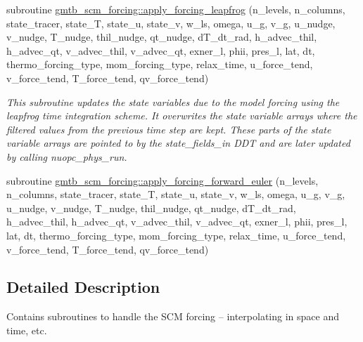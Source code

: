 {\bf }\par
\begin{DoxyCompactItemize}
\item 
subroutine \hyperlink{group__forcing_gaa9a429a52d986be1bc2458f56e8f77aa}{gmtb\+\_\+scm\+\_\+forcing\+::apply\+\_\+forcing\+\_\+leapfrog} (n\+\_\+levels, n\+\_\+columns, state\+\_\+tracer, state\+\_\+T, state\+\_\+u, state\+\_\+v, w\+\_\+ls, omega, u\+\_\+g, v\+\_\+g, u\+\_\+nudge,   v\+\_\+nudge, T\+\_\+nudge, thil\+\_\+nudge, qt\+\_\+nudge, d\+T\+\_\+dt\+\_\+rad, h\+\_\+advec\+\_\+thil, h\+\_\+advec\+\_\+qt, v\+\_\+advec\+\_\+thil, v\+\_\+advec\+\_\+qt, exner\+\_\+l, phii, pres\+\_\+l,   lat, dt, thermo\+\_\+forcing\+\_\+type, mom\+\_\+forcing\+\_\+type, relax\+\_\+time, u\+\_\+force\+\_\+tend, v\+\_\+force\+\_\+tend, T\+\_\+force\+\_\+tend, qv\+\_\+force\+\_\+tend)
\begin{DoxyCompactList}\small\item\em This subroutine updates the state variables due to the model forcing using the leapfrog time integration scheme. It overwrites the state variable arrays where the filtered values from the previous time step are kept. These parts of the state variable arrays are pointed to by the state\+\_\+fields\+\_\+in D\+DT and are later updated by calling nuopc\+\_\+phys\+\_\+run. \end{DoxyCompactList}\end{DoxyCompactItemize}

{\bf }\par
\begin{DoxyCompactItemize}
\item 
subroutine \hyperlink{group__forcing_ga9f9e7db891365f55c3ce79e70a8fe580}{gmtb\+\_\+scm\+\_\+forcing\+::apply\+\_\+forcing\+\_\+forward\+\_\+euler} (n\+\_\+levels, n\+\_\+columns, state\+\_\+tracer, state\+\_\+T, state\+\_\+u, state\+\_\+v, w\+\_\+ls, omega, u\+\_\+g, v\+\_\+g,   u\+\_\+nudge, v\+\_\+nudge, T\+\_\+nudge, thil\+\_\+nudge, qt\+\_\+nudge, d\+T\+\_\+dt\+\_\+rad, h\+\_\+advec\+\_\+thil, h\+\_\+advec\+\_\+qt, v\+\_\+advec\+\_\+thil, v\+\_\+advec\+\_\+qt, exner\+\_\+l, phii,   pres\+\_\+l, lat, dt, thermo\+\_\+forcing\+\_\+type, mom\+\_\+forcing\+\_\+type, relax\+\_\+time, u\+\_\+force\+\_\+tend, v\+\_\+force\+\_\+tend, T\+\_\+force\+\_\+tend, qv\+\_\+force\+\_\+tend)
\end{DoxyCompactItemize}



\subsection{Detailed Description}
Contains subroutines to handle the S\+CM forcing -- interpolating in space and time, etc. 

